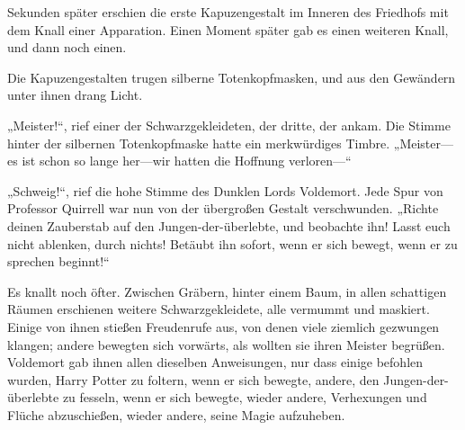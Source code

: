 Sekunden später erschien die erste Kapuzengestalt im Inneren des Friedhofs mit dem Knall einer Apparation. Einen Moment später gab es einen weiteren Knall, und dann noch einen.

Die Kapuzengestalten trugen silberne Totenkopfmasken, und aus den Gewändern unter ihnen drang Licht.

„Meister!“, rief einer der Schwarzgekleideten, der dritte, der ankam. Die Stimme hinter der silbernen Totenkopfmaske hatte ein merkwürdiges Timbre.
„Meister—es ist schon so lange her—wir hatten die Hoffnung verloren—“

„Schweig!“, rief die hohe Stimme des Dunklen Lords Voldemort.
Jede Spur von Professor Quirrell war nun von der übergroßen Gestalt verschwunden.
„Richte deinen Zauberstab auf den Jungen-der-überlebte, und beobachte ihn! Lasst euch nicht ablenken, durch nichts! Betäubt ihn sofort, wenn er sich bewegt, wenn er zu sprechen beginnt!“

Es knallt noch öfter.
Zwischen Gräbern, hinter einem Baum, in allen schattigen Räumen erschienen weitere Schwarzgekleidete, alle vermummt und maskiert. Einige von ihnen stießen Freudenrufe aus, von denen viele ziemlich gezwungen klangen; andere bewegten sich vorwärts, als wollten sie ihren Meister begrüßen. Voldemort gab ihnen allen dieselben Anweisungen, nur dass einige befohlen wurden, Harry Potter zu foltern, wenn er sich bewegte, andere, den Jungen-der-überlebte zu fesseln, wenn er sich bewegte, wieder andere, Verhexungen und Flüche abzuschießen, wieder andere, seine Magie aufzuheben.

